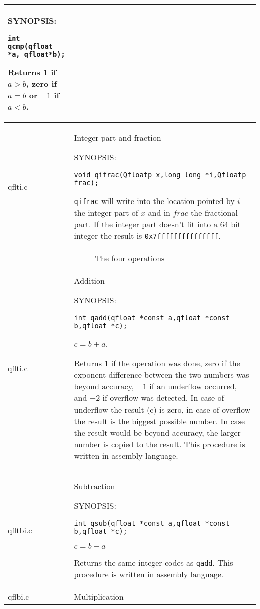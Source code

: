 \documentclass[10pt,a4paper,x11names]{memoir} %
\newcommand{\TOC}[1] {\addcontentsline{toc}{section}{#1} #1 \par}
\begin{document}
\begin{longtable}{|p{1.5cm}|p{11.5cm}|}
	{\footnotesize SYNOPSIS:}\vspace{-0.2cm}\index{qcmp}
	\begin{lstlisting}[numbers=none]
		int qcmp(qfloat *a, qfloat*b);
	\end{lstlisting}\vspace{-0.2cm} \par
	Returns 1 if $a> b$, zero if $a = b$ or $-1$ if $a<b$.
	\\\hline
	qflti.c& \TOC{Integer part and fraction}
	
	{\footnotesize SYNOPSIS:}\vspace{-0.2cm}\index{qifrac}
	\begin{lstlisting}[numbers=none]
		void qifrac(Qfloatp x,long long *i,Qfloatp frac);
	\end{lstlisting}\vspace{-0.2cm} \par
	\verb,qifrac, will write into the location pointed by $i$ the integer part of $x$ and in $frac$ the fractional part. If the integer part doesn't fit into a 64 bit integer the result is \verb,0x7fffffffffffffff,.
	\\\hline
	\multicolumn{2}{c}{The four operations}
	\\\hline
	qflti.c& \TOC{Addition}\index{qadd}
	
	{\footnotesize SYNOPSIS:}\vspace{-0.2cm}
	\begin{lstlisting}[numbers=none]
		int qadd(qfloat *const a,qfloat *const b,qfloat *c);
	\end{lstlisting}\vspace{-0.2cm} $ c=b+a$.\par
	Returns 1 if the operation was done, zero if the exponent difference between the two numbers was beyond accuracy, $-1$ if an underflow occurred, and $-2$ if overflow was detected. In case of underflow the result (c) is zero, in case of overflow the result is the biggest possible number. In case the result would be beyond accuracy, the larger number is copied to the result.
	This procedure is written in assembly language.
	\\\hline
	
	qfltbi.c& \TOC{Subtraction}
	
	{\footnotesize SYNOPSIS:}\vspace{-0.2cm}\index{qsub}
	\begin{lstlisting}[numbers=none]
		int qsub(qfloat *const a,qfloat *const b,qfloat *c);
	\end{lstlisting}\vspace{-0.2cm}
	$ c=b-a$\par
	Returns the same integer codes as \verb,qadd,. This procedure is written in assembly language.
	\\\hline
	qflbi.c& \TOC{Multiplication}
	

\end{longtable}
\end{document}
